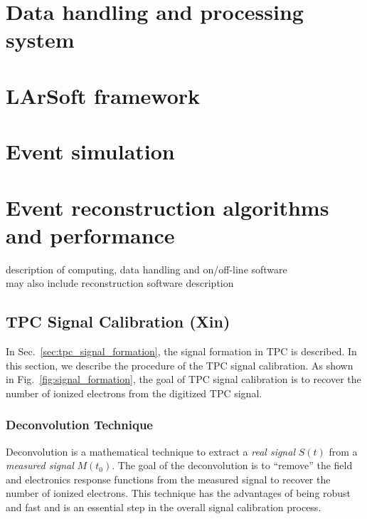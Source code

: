 
\section{Data handling and processing system}

\section{LArSoft framework}

\section{Event simulation}

\section{Event reconstruction algorithms and performance}

description of computing, data handling and on/off-line software\\

may also include reconstruction software description

\subsection{TPC Signal Calibration (Xin)}

In Sec.~\ref{sec:tpc_signal_formation}, the signal formation in TPC
is described. In this section, we describe the procedure of the TPC signal
calibration. As shown in Fig.~\ref{fig:signal_formation}, the goal of TPC 
signal calibration is to recover the number of ionized electrons from the 
digitized TPC signal. 

\subsubsection{Deconvolution Technique}\label{sec:decon}
Deconvolution is a mathematical technique to extract a \textit{real signal}
$S(t)$ from a \textit{measured signal} $M(t_0)$. The goal of the 
deconvolution is to ``remove'' the field and electronics response functions 
from the measured signal to recover the number of ionized electrons. This 
technique has the advantages of being robust and fast and is an essential 
step in the overall signal calibration process. 


